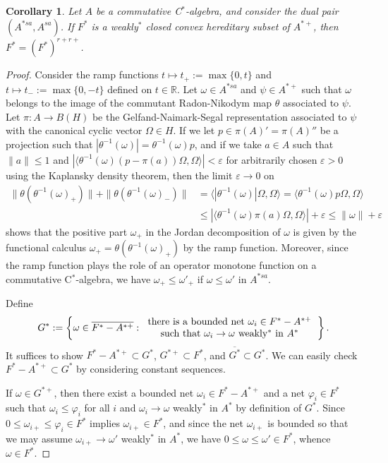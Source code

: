 \documentclass[noamsfonts,a4paper,10pt]{amsart}
\theoremstyle{plain}
\newtheorem{cor}[thm]{Corollary}
\theoremstyle{definition}
\theoremstyle{remark}
\begin{document}
\begin{cor}
Let $A$ be a commutative C$^*$-algebra, and consider the dual pair $(A^{*sa},A^{sa})$.
If $F^*$ is a weakly$^*$ closed convex hereditary subset of $A^{*+}$, then $F^*=(F^*)^{r+r+}$.
\end{cor}
\begin{proof}
Consider the ramp functions $t\mapsto t_+:=\max\{0,t\}$ and $t\mapsto t_-:=\max\{0,-t\}$ defined on $t\in\mathbb{R}$.
Let $\omega\in A^{*sa}$ and $\psi\in A^{*+}$ such that $\omega$ belongs to the image of the commutant Radon-Nikodym map $\theta$ associated to $\psi$.
Let $\pi:A\to B(H)$ be the Gelfand-Naimark-Segal representation associated to $\psi$ with the canonical cyclic vector $\Omega\in H$.
If we let $p\in\pi(A)'=\pi(A)''$ be a projection such that $|\theta^{-1}(\omega)|=\theta^{-1}(\omega)p$, and if we take $a\in A$ such that $\|a\|\le1$ and $|\langle\theta^{-1}(\omega)(p-\pi(a))\Omega,\Omega\rangle|<\varepsilon$ for arbitrarily chosen $\varepsilon>0$ using the Kaplansky density theorem, then the limit $\varepsilon\to0$ on
\begin{align*}
\|\theta(\theta^{-1}(\omega)_+)\|+\|\theta(\theta^{-1}(\omega)_-)\|
&=\langle|\theta^{-1}(\omega)|\Omega,\Omega\rangle
=\langle\theta^{-1}(\omega)p\Omega,\Omega\rangle\\
&\le|\langle\theta^{-1}(\omega)\pi(a)\Omega,\Omega\rangle|+\varepsilon\le\|\omega\|+\varepsilon
\end{align*}
shows that the positive part $\omega_+$ in the Jordan decomposition of $\omega$ is given by the functional calculus $\omega_+=\theta(\theta^{-1}(\omega)_+)$ by the ramp function.
Moreover, since the ramp function plays the role of an operator monotone function on a commutative C$^*$-algebra, we have $\omega_+\le\omega'_+$ if $\omega\le\omega'$ in $A^{*sa}$.

Define
\[G^*:=\left\{\omega\in\overline{F^*-A^{*+}}:\begin{tabular}{c}there is a bounded net $\omega_i\in F^*-A^{*+}$\\such that $\omega_i\to\omega$ weakly$^*$ in $A^*$\end{tabular}\right\}.\]
It suffices to show $F^*-A^{*+}\subset G^*$, $G^{*+}\subset F^*$, and $\overline{G^*}\subset G^*$.
We can easily check $F^*-A^{*+}\subset G^*$ by considering constant sequences.

If $\omega\in G^{*+}$, then there exist a bounded net $\omega_i\in F^*-A^{*+}$ and a net $\varphi_i\in F^*$ such that $\omega_i\le\varphi_i$ for all $i$ and $\omega_i\to\omega$ weakly$^*$ in $A^*$ by definition of $G^*$.
Since $0\le\omega_{i+}\le\varphi_i\in F^*$ implies $\omega_{i+}\in F^*$, and since the net $\omega_{i+}$ is bounded so that we may assume $\omega_{i+}\to\omega'$ weakly$^*$ in $A^*$, we have $0\le\omega\le\omega'\in F^*$, whence $\omega\in F^*$.


\end{proof}
\end{document}
